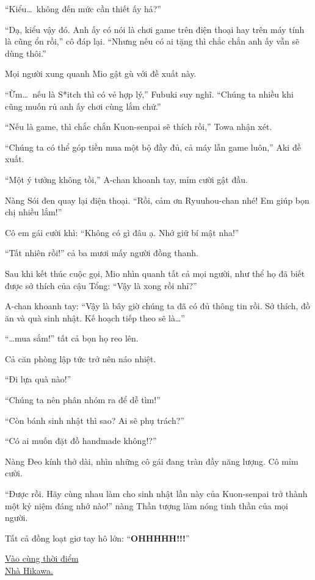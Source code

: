 \documentclass[../main.tex]{subfiles}
\begin{document}
``Kiểu\dots\ không đến mức cần thiết ấy hả?''

``Dạ, kiểu vậy đó. Anh ấy có nói là chơi game trên điện thoại hay trên máy tính là cũng ổn rồi,'' cô đáp lại. ``Nhưng nếu có ai tặng thì chắc chắn anh ấy vẫn sẽ dùng thôi.''

Mọi người xung quanh Mio gật gù với đề xuất này.

``Ừm\dots\ nếu là S*itch thì có vẻ hợp lý,'' Fubuki suy nghĩ. ``Chúng ta nhiều khi cũng muốn rủ anh ấy chơi cùng lắm chứ.''

``Nếu là game, thì chắc chắn Kuon-senpai sẽ thích rồi,'' Towa nhận xét.

``Chúng ta có thể góp tiền mua một bộ đầy đủ, cả máy lẫn game luôn,'' Aki đề xuất.

``Một ý tưởng không tồi,'' A-chan khoanh tay, mỉm cười gật đầu.

Nàng Sói đen quay lại điện thoại. ``Rồi, cảm ơn Ryuuhou-chan nhé! Em giúp bọn chị nhiều lắm!''

Cô em gái cười khì: ``Không có gì đâu ạ. Nhớ giữ bí mật nha!''

``Tất nhiên rồi!'' cả ba mươi mấy người đồng thanh.

Sau khi kết thúc cuộc gọi, Mio nhìn quanh tất cả mọi người, như thể họ đã biết được sở thích của cậu Tổng: ``Vậy là xong rồi nhỉ?''

A-chan khoanh tay: ``Vậy là bây giờ chúng ta đã có đủ thông tin rồi. Sở thích, đồ ăn và quà sinh nhật. Kế hoạch tiếp theo sẽ là\dots''

``\dots mua sắm!'' tất cả bọn họ reo lên.

Cả căn phòng lập tức trở nên náo nhiệt.

``Đi lựa quà nào!''

``Chúng ta nên phân nhóm ra để dễ tìm!''

``Còn bánh sinh nhật thì sao? Ai sẽ phụ trách?''

``Có ai muốn đặt đồ handmade không!?''

Nàng Đeo kính thở dài, nhìn những cô gái đang tràn đầy năng lượng. Cô mỉm cười.

``Được rồi. Hãy cùng nhau làm cho sinh nhật lần này của Kuon-senpai trở thành một kỷ niệm đáng nhớ nào!'' nàng Thần tượng làm nóng tinh thần của mọi người.

Tất cả đồng loạt giơ tay hô lớn: ``\textbf{OHHHHH!!!}''

\begin{center}
    \uline{Vào cùng thời điểm\\Nhà Hikawa.}
\end{center}
\end{document}
